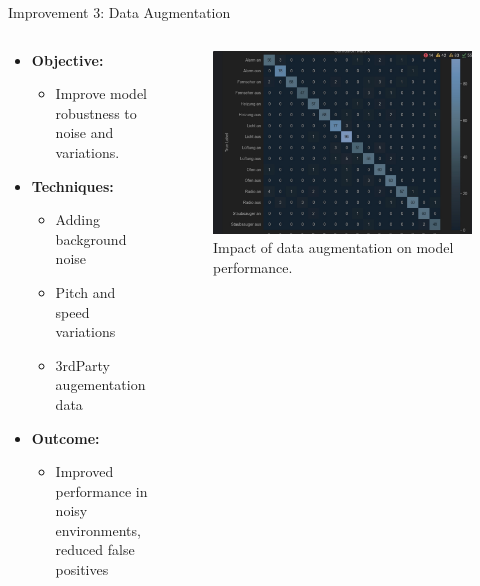 \documentclass{beamer}
\begin{document}
\begin{frame}{Improvement 3: Data Augmentation}
  \begin{columns}
    \begin{column}{0.5\textwidth}
      \begin{itemize}
        \item \textbf{Objective:}
            \begin{itemize}
            \item Improve model robustness to noise and variations.
            \end{itemize}
        \item \textbf{Techniques:}
          \begin{itemize}
            \item Adding background noise
            \item Pitch and speed variations
            \item 3rdParty augementation data
          \end{itemize}
        \item \textbf{Outcome:}
          \begin{itemize}
            \item Improved performance in noisy environments, reduced false positives
          \end{itemize}
      \end{itemize}
    \end{column}
    \begin{column}{0.5\textwidth}
      \begin{figure}
        \includegraphics[width=\textwidth]{fig/tuned_heatmap.jpeg}
        \caption{Impact of data augmentation on model performance.}
      \end{figure}
    \end{column}
  \end{columns}
\end{frame}
\end{document}
